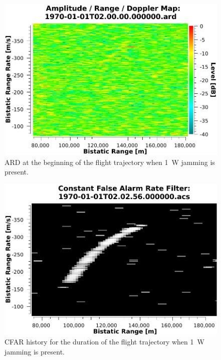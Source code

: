 \documentclass[conference]{IEEEtran}
\begin{document}
\begin{figure}[htbp]
\begin{center}
\includegraphics[width=1.0\columnwidth]{figs/Simulations/1WJammingARDFirst.pdf}
\caption{ARD at the beginning of the flight trajectory when 1~W jamming is present.}
\label{fig:1WJammingARDFirst}
\end{center}
\end{figure}



\begin{figure}[htbp]
\begin{center}
\includegraphics[width=1.0\columnwidth]{figs/Simulations/1WJammingCFAR.pdf}
\caption{CFAR history for the duration of the flight trajectory when 1~W jamming is present.}
\label{fig:1WJammingARDCFAR}
\end{center}
\end{figure}
\end{document}
